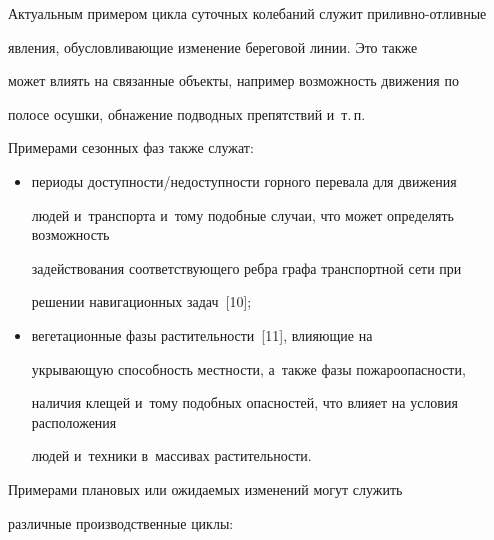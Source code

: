   


  Актуальным примером цикла суточных колебаний служит при\-лив\-но-от\-лив\-ные 


  явления, обуслов\-ли\-ва\-ющие изменение береговой линии. Это также 


может влиять на связанные объекты, например воз\-мож\-ность движения по 


полосе осуш\-ки, обнажение подводных препятствий и~т.\,п.


  


  Примерами сезонных фаз также служат:\\[-14pt]


  \begin{itemize}


  \item  периоды доступности\!/\!недоступности горного перевала для движения 


людей и~транспорта и~тому подобные случаи, что может определять воз\-мож\-ность 


задействования со\-от\-вет\-ст\-ву\-юще\-го реб\-ра графа транспортной сети при 


решении навигационных задач~[10];\\[-14pt]


  \item вегетационные фазы растительности~[11], вли\-я\-ющие на 


укры\-ва\-ющую спо\-соб\-ность мест\-ности, а~также фазы пожароопасности, 


наличия клещей и~тому подобных опасностей, что влияет на условия расположения 


людей и~техники в~массивах рас\-ти\-тель\-ности.\\[-14pt]


  \end{itemize}


  


  Примерами плановых или ожидаемых изменений могут служить 


различные производственные циклы:\\[-14pt]


